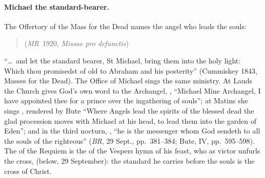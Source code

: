 \paragraph{Michael the standard-bearer.} The Offertory of the Mass for
the Dead names the angel who leads the souls:
\begin{quote}
 (\emph{MR}~1920, \emph{Missae pro
defunctis})
\end{quote}
``\dots\ and let the standard bearer, St Michael, bring them into the holy
light: Which thou promisedst of old to Abraham and his posterity''
(Cummiskey 1843, Masses for the Dead). The Office of Michael sings the
same ministry. At Lauds the Church gives God's own word to the
Archangel, , ``Michael Mine Archangel, I have appointed thee for
a prince over the ingathering of souls''; at Matins she sings
,
rendered by Bute ``Where Angels lead the spirits of the blessed dead the
glad procession moves with Michael at his head, to lead them into the
garden of Eden''; and in the third nocturn, , ``he is the messenger whom God
sendeth to all the souls of the righteous'' (\emph{BR}, 29 Sept.,
pp.~381--384; Bute, IV, pp.~595--598). The  of the
Requiem is the  of the Vespers hymn of his feast,
who as victor unfurls the cross,  (below, 29
September): the standard he carries before the souls is the cross of
Christ.

